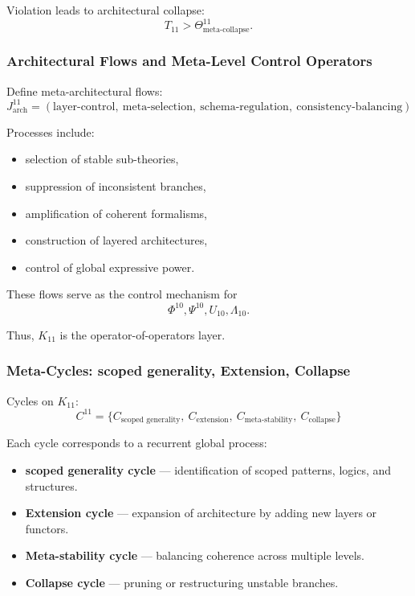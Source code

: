 Violation leads to architectural collapse:
\[
T_{11} > \Theta^{11}_{\text{meta-collapse}}.
\]

\subsubsection{Architectural Flows and Meta-Level Control Operators}

Define meta-architectural flows:
\[
J^{11}_{\text{arch}} = 
(\text{layer-control},\ \text{meta-selection},\ 
 \text{schema-regulation},\ \text{consistency-balancing})
\]

Processes include:
\begin{itemize}
    \item selection of stable sub-theories,
    \item suppression of inconsistent branches,
    \item amplification of coherent formalisms,
    \item construction of layered architectures,
    \item control of global expressive power.
\end{itemize}

These flows serve as the control mechanism for 
\[
\Phi^{10}, \Psi^{10}, U_{10}, \Lambda_{10}.
\]

Thus, $K_{11}$ is the operator-of-operators layer.

\subsubsection{Meta-Cycles: scoped generality, Extension, Collapse}

Cycles on $K_{11}$:
\[
C^{11} = \{
C_{\text{scoped generality}},\ 
C_{\text{extension}},\ 
C_{\text{meta-stability}},\
C_{\text{collapse}}
\}
\]

Each cycle corresponds to a recurrent global process:

\begin{itemize}
    \item \textbf{scoped generality cycle}  
      — identification of scoped patterns, logics, and structures.

    \item \textbf{Extension cycle}  
      — expansion of architecture by adding new layers or functors.

    \item \textbf{Meta-stability cycle}  
      — balancing coherence across multiple levels.

    \item \textbf{Collapse cycle}  
      — pruning or restructuring unstable branches.
\end{itemize}

